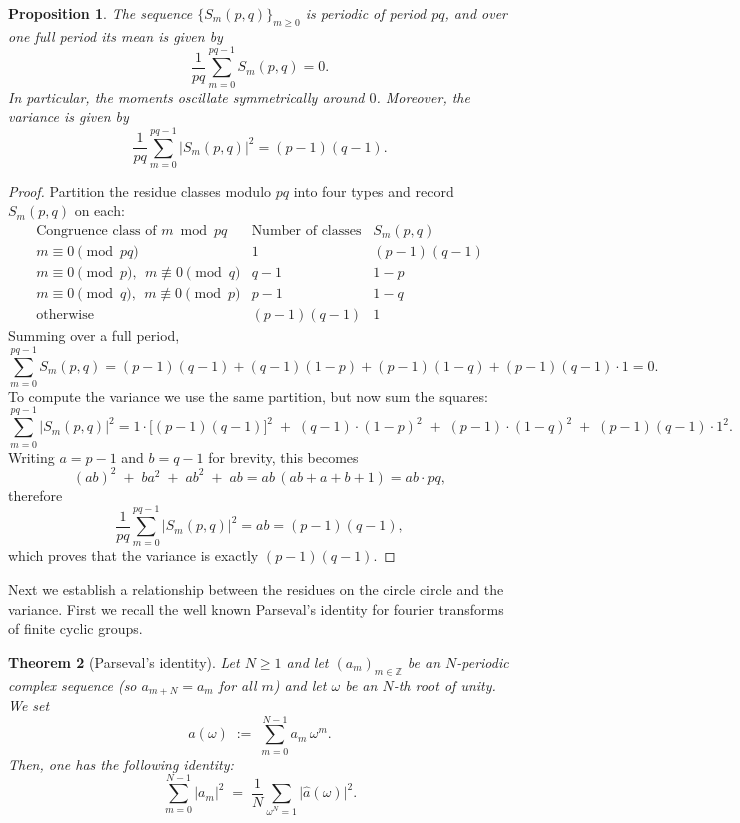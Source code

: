 \documentclass[table]{amsart}
\newtheorem{theorem}{Theorem}[section]
\newtheorem{proposition}[theorem]{Proposition}
\numberwithin{equation}{section}
\begin{document}
\begin{proposition}
The sequence \(\{S_m(p,q)\}_{m\ge 0}\) is periodic of period \(pq\), and over one full period its mean is given by \[\frac{1}{pq}\sum_{m=0}^{pq-1} S_m(p,q)=0.\]
In particular, the moments oscillate symmetrically around \(0\). Moreover, the variance is given by
\[\frac{1}{pq}\sum_{m=0}^{pq-1}|S_m(p,q)|^2=(p-1)(q-1).\]
\end{proposition}
\begin{proof}
Partition the residue classes modulo \(pq\) into four types and record \(S_m(p,q)\) on each:
\[
\begin{array}{c|c|c}
\text{Congruence class of } m \bmod pq & \text{Number of classes} & S_m(p,q) \\ \hline
m \equiv 0 \pmod{pq} & 1 & (p-1)(q-1) \\[6pt]
m \equiv 0 \pmod p,\ \ m \not\equiv 0 \pmod q & q-1 & 1-p \\[6pt]
m \equiv 0 \pmod q,\ \ m \not\equiv 0 \pmod p & p-1 & 1-q \\[6pt]
\text{otherwise} & (p-1)(q-1) & 1
\end{array}
\]
\noindent Summing over a full period,
\[
\sum_{m=0}^{pq-1}S_m(p,q)
=(p-1)(q-1)+(q-1)(1-p)+(p-1)(1-q)+(p-1)(q-1)\cdot 1=0.
\]\noindent To compute the variance we use the same partition, but now sum the squares:
\[
\sum_{m=0}^{pq-1} |S_m(p,q)|^2
= 1\cdot\big[(p-1)(q-1)\big]^2 \;+\; (q-1)\cdot(1-p)^2 \;+\; (p-1)\cdot(1-q)^2 
\;+\; (p-1)(q-1)\cdot 1^2.
\]
Writing $a=p-1$ and $b=q-1$ for brevity, this becomes
\[
(a b)^2 \;+\; b a^2 \;+\; a b^2 \;+\; a b
= a b\,(a b + a + b + 1)
= a b \cdot pq,
\]
\noindent therefore
\[
\frac{1}{pq} \sum_{m=0}^{pq-1} |S_m(p,q)|^2 = ab = (p-1)(q-1),
\]
which proves that the variance is exactly $(p-1)(q-1)$.
\end{proof}

\par Next we establish a relationship between the residues on the circle circle and the variance. First we recall the well known Parseval's identity for fourier transforms of finite cyclic groups.
\begin{theorem}[Parseval's identity]\label{parseval thm}
Let \(N\ge1\) and let \((a_m)_{m\in\mathbb Z}\) be an \(N\)-periodic complex sequence (so \(a_{m+N}=a_m\) for all \(m\)) and let $\omega$ be an \(N\)-th root of unity. We set
\[
\widehat a(\omega)\;:=\;\sum_{m=0}^{N-1} a_m\,\omega^m.
\]
Then, one has the following identity:
\[
\sum_{m=0}^{N-1}\big|a_m\big|^2 \;=\; \frac{1}{N}\sum_{\omega^N=1}\big|\widehat a(\omega)\big|^2.
\]
\end{theorem}
\end{document}
